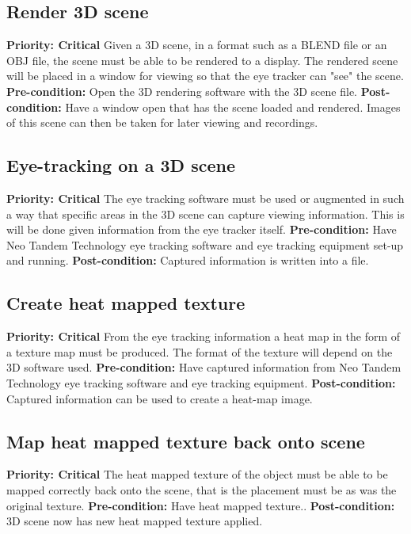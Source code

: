 \subsection{Render 3D scene}
    \textbf{Priority: Critical}\newline
    Given a 3D scene, in a format such as a BLEND file or an OBJ file, the scene must be able to be rendered to a display. The rendered scene will be placed in a window for viewing so that the eye tracker can "see" the scene.\newline
    \textbf{Pre-condition: }
    Open the 3D rendering software with the 3D scene file.\newline
    \textbf{Post-condition: }
    Have a window open that has the scene loaded and rendered. Images of this scene can then be taken for later viewing and recordings.
    
\subsection{Eye-tracking on a 3D scene}
    \textbf{Priority: Critical}\newline
    The eye tracking software must be used or augmented in such a way that specific areas in the 3D scene can capture viewing information. This is will be done given information from the eye tracker itself.\newline
    \textbf{Pre-condition: }
    Have Neo Tandem Technology eye tracking software and eye tracking equipment set-up and running.\newline
    \textbf{Post-condition: }
    Captured information is written into a file.
    
\subsection{Create heat mapped texture}
    \textbf{Priority: Critical}\newline
    From the eye tracking information a heat map in the form of a texture map must be produced. The format of the texture will depend on the 3D software used.\newline
    \textbf{Pre-condition: }
    Have captured information from Neo Tandem Technology eye tracking software and eye tracking equipment.\newline
    \textbf{Post-condition: }
    Captured information can be used to create a heat-map image.
    
\subsection{Map heat mapped texture back onto scene}
    \textbf{Priority: Critical}\newline
    The heat mapped texture of the object must be able to be mapped correctly back onto the scene, that is the placement must be as was the original texture.\newline
    \textbf{Pre-condition: }
    Have heat mapped texture..\newline
    \textbf{Post-condition: }
    3D scene now has new heat mapped texture applied.
    
